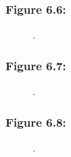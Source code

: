 \documentclass[t]{beamer}\usepackage[]{graphicx}\usepackage[]{color}
\begin{document}
\begin{frame}[label=Figure_6_6]
\frametitle{Figure 6.6: }
\begin{figure}[t]
\begin{minipage}[b]{\textwidth}
\centering

\caption{.}
\end{minipage}
\end{figure}
\end{frame}


\begin{frame}[label=Figure_6_7]
\frametitle{Figure 6.7: }
\begin{figure}[t]
\begin{minipage}[b]{\textwidth}
\centering

\caption{.}
\end{minipage}
\end{figure}
\end{frame}


\begin{frame}[label=Figure_6_8]
\frametitle{Figure 6.8: }
\begin{figure}[t]
\begin{minipage}[b]{\textwidth}
\centering

\caption{.}
\end{minipage}
\end{figure}
\end{frame}
\end{document}
